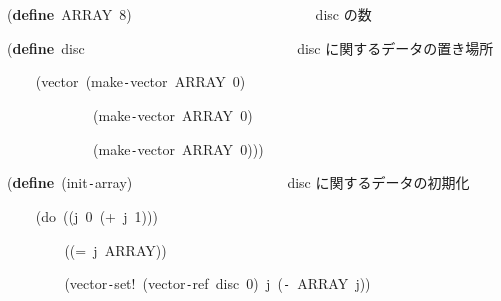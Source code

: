 \documentclass[a4paper,10pt]{article}
\def\mc{\relax}
\begin{document}
\noindent
\mbox{}(\textbf{define}{\tt\mc \ }ARRAY{\tt\mc \ }8){\tt\mc \ }{\tt\mc \ }{\tt\mc \ }{\tt\mc \ }{\tt\mc \ }{\tt\mc \ }{\tt\mc \ }{\tt\mc \ }{\tt\mc \ }{\tt\mc \ }{\tt\mc \ }{\tt\mc \ }{\tt\mc \ }{\tt\mc \ }{\tt\mc \ }{\tt\mc \ }{\tt\mc \ }{\tt\mc \ }{\tt\mc \ }{\tt\mc \ }{\tt\mc \ }{\tt\mc \ }{\tt\mc \ }{\tt\mc \ }\rm\mc {\tt ;} \ disc の数 \hfill
\tt\mc 

\noindent
\mbox{}\hfill

\noindent
\mbox{}(\textbf{define}{\tt\mc \ }disc{\tt\mc \ }{\tt\mc \ }{\tt\mc \ }{\tt\mc \ }{\tt\mc \ }{\tt\mc \ }{\tt\mc \ }{\tt\mc \ }{\tt\mc \ }{\tt\mc \ }{\tt\mc \ }{\tt\mc \ }{\tt\mc \ }{\tt\mc \ }{\tt\mc \ }{\tt\mc \ }{\tt\mc \ }{\tt\mc \ }{\tt\mc \ }{\tt\mc \ }{\tt\mc \ }{\tt\mc \ }{\tt\mc \ }{\tt\mc \ }{\tt\mc \ }{\tt\mc \ }{\tt\mc \ }{\tt\mc \ }\rm\mc {\tt ;} \ disc に関するデータの置き場所\hfill
\tt\mc 

\noindent
\mbox{}{\tt\mc \ }{\tt\mc \ }{\tt\mc \ }{\tt\mc \ }(vector{\tt\mc \ }(make{\tt -}vector{\tt\mc \ }ARRAY{\tt\mc \ }0)

\noindent
\mbox{}{\tt\mc \ }{\tt\mc \ }{\tt\mc \ }{\tt\mc \ }{\tt\mc \ }{\tt\mc \ }{\tt\mc \ }{\tt\mc \ }{\tt\mc \ }{\tt\mc \ }{\tt\mc \ }{\tt\mc \ }(make{\tt -}vector{\tt\mc \ }ARRAY{\tt\mc \ }0)

\noindent
\mbox{}{\tt\mc \ }{\tt\mc \ }{\tt\mc \ }{\tt\mc \ }{\tt\mc \ }{\tt\mc \ }{\tt\mc \ }{\tt\mc \ }{\tt\mc \ }{\tt\mc \ }{\tt\mc \ }{\tt\mc \ }(make{\tt -}vector{\tt\mc \ }ARRAY{\tt\mc \ }0)))

\noindent
\mbox{}\hfill

\noindent
\mbox{}(\textbf{define}{\tt\mc \ }(init{\tt -}array){\tt\mc \ }{\tt\mc \ }{\tt\mc \ }{\tt\mc \ }{\tt\mc \ }{\tt\mc \ }{\tt\mc \ }{\tt\mc \ }{\tt\mc \ }{\tt\mc \ }{\tt\mc \ }{\tt\mc \ }{\tt\mc \ }{\tt\mc \ }{\tt\mc \ }{\tt\mc \ }{\tt\mc \ }{\tt\mc \ }{\tt\mc \ }{\tt\mc \ }\rm\mc {\tt ;} \ disc に関するデータの初期化\hfill
\tt\mc 

\noindent
\mbox{}{\tt\mc \ }{\tt\mc \ }{\tt\mc \ }{\tt\mc \ }(do{\tt\mc \ }((j{\tt\mc \ }0{\tt\mc \ }(+{\tt\mc \ }j{\tt\mc \ }1)))

\noindent
\mbox{}{\tt\mc \ }{\tt\mc \ }{\tt\mc \ }{\tt\mc \ }{\tt\mc \ }{\tt\mc \ }{\tt\mc \ }{\tt\mc \ }((={\tt\mc \ }j{\tt\mc \ }ARRAY))

\noindent
\mbox{}{\tt\mc \ }{\tt\mc \ }{\tt\mc \ }{\tt\mc \ }{\tt\mc \ }{\tt\mc \ }{\tt\mc \ }{\tt\mc \ }(vector{\tt -}set!{\tt\mc \ }(vector{\tt -}ref{\tt\mc \ }disc{\tt\mc \ }0){\tt\mc \ }j{\tt\mc \ }({\tt -}{\tt\mc \ }ARRAY{\tt\mc \ }j))
\end{document}
